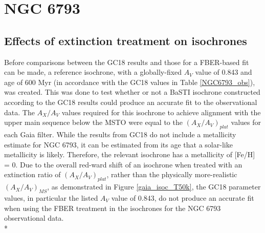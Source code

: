 \documentclass[12pt, a4paper]{report}
\begin{document}
\section{NGC 6793} \label{ngc6793_res_disc}
\subsection{Effects of extinction treatment on isochrones}

Before comparisons between the GC18 results and those for a FBER-based fit can be made, a reference isochrone, with a globally-fixed $A_{V}$ value of 0.843 and age of 600 Myr (in accordance with the GC18 values in Table \ref{NGC6793_obs}), was created. This was done to test whether or not a BaSTI isochrone constructed according to the GC18 results could produce an accurate fit to the observational data. The $A_{X}/A_{V}$ values required for this isochrone to achieve alignment with the upper main sequence below the MSTO were equal to the $(A_{X}/A_{V})_{plat}$ values for each Gaia filter. While the results from GC18 do not include a metallicity estimate for NGC 6793, it can be estimated from its age that a solar-like metallicity is likely. Therefore, the relevant isochrone has a metallicity of [Fe/H] = 0. Due to the overall red-ward shift of an isochrone when treated with an extinction ratio of $(A_{X}/A_{V})_{plat}$, rather than the physically more-realistic $(A_{X}/A_{V})_{MS}$, as demonstrated in Figure \ref{gaia_isoc_T50k}, the GC18 parameter values, in particular the listed $A_{V}$ value of 0.843, do not produce an accurate fit when using the FBER treatment in the isochrones for the NGC 6793 observational data.\\*
\end{document}
